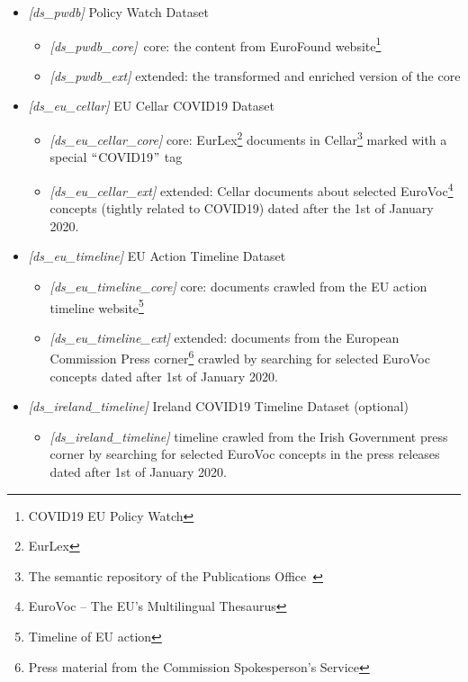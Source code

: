 \begin{itemize}
	\item \textit{[ds\_pwdb]} Policy Watch Dataset 
        \begin{itemize}
        	\item \textit{[ds\_pwdb\_core]}\ core:  the content from EuroFound website\footnote{ COVID19 EU Policy Watch }
        	\item \textit{[ds\_pwdb\_ext]} extended: the transformed and enriched version of the core
        \end{itemize}
	\item \textit{[ds\_eu\_cellar]} EU Cellar COVID19 Dataset 
        \begin{itemize}
        	\item \textit{[ds\_eu\_cellar\_core]} core: EurLex\footnote{ EurLex } documents in Cellar\footnote{ The semantic repository of the Publications Office\   } marked with a special $``$COVID19$"$  tag
        	\item \textit{[ds\_eu\_cellar\_ext]} extended: Cellar documents about selected EuroVoc\footnote{ EuroVoc – The EU's Multilingual Thesaurus } concepts (tightly related to COVID19) dated after the 1st of January 2020.
        \end{itemize}
	\item \textit{[ds\_eu\_timeline]} EU Action Timeline Dataset 
        \begin{itemize}
        	\item \textit{[ds\_eu\_timeline\_core]} core: documents crawled from the EU action timeline website\footnote{ Timeline of EU action } 
        	\item \textit{[ds\_eu\_timeline\_ext]} extended: documents from the European Commission Press corner\footnote{ Press material from the Commission Spokesperson's Service } crawled by searching for selected EuroVoc concepts dated after 1st of January 2020.
        \end{itemize}
	\item \textit{[ds\_ireland\_timeline]} Ireland COVID19 Timeline Dataset (optional)
        \begin{itemize}
        	\item \textit{[ds\_ireland\_timeline] }timeline crawled from the Irish Government press corner by searching for selected EuroVoc concepts in the press releases dated after 1st of January 2020. 
        \end{itemize}
\end{itemize}

